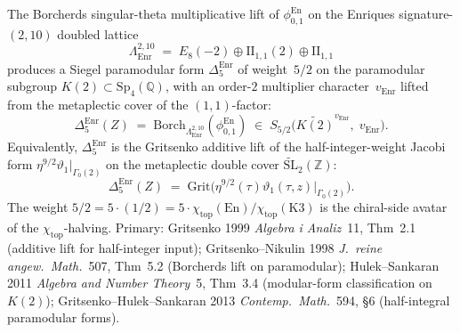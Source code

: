 \begin{theorem}
\label{thm:bkm-enriques-delta5}
The Borcherds singular-theta multiplicative lift of
$\phi^{\mathrm{En}}_{0,1}$ on the Enriques signature-$(2,10)$
doubled lattice
\[
 \Lambda^{2,10}_{\mathrm{Enr}}
 \;=\;
 E_8(-2) \oplus \mathrm{II}_{1,1}(2) \oplus \mathrm{II}_{1,1}
\]
produces a Siegel paramodular form $\Delta_5^{\mathrm{Enr}}$ of
weight~$5/2$ on the paramodular subgroup
$K(2)\subset\mathrm{Sp}_4(\mathbb{Q})$, with an order-$2$ multiplier
character~$v_{\mathrm{Enr}}$ lifted from the metaplectic cover of
the $(1,1)$-factor:
\[
 \Delta_5^{\mathrm{Enr}}(Z)
 \;=\;
 \mathrm{Borch}_{\Lambda^{2,10}_{\mathrm{Enr}}}(\phi^{\mathrm{En}}_{0,1})
 \;\in\;
 S_{5/2}\bigl(\widetilde{K(2)}^{v_{\mathrm{Enr}}},\; v_{\mathrm{Enr}}\bigr).
\]
Equivalently,
$\Delta_5^{\mathrm{Enr}}$ is the Gritsenko additive lift of the
half-integer-weight Jacobi form
$\eta^{9/2}\vartheta_1\bigr|_{\Gamma_0(2)}$ on the
metaplectic double cover $\widetilde{\mathrm{SL}}_2(\mathbb{Z})$:
\[
 \Delta_5^{\mathrm{Enr}}(Z)
 \;=\;
 \mathrm{Grit}\bigl(\eta^{9/2}(\tau)\vartheta_1(\tau,z)\bigr|_{\Gamma_0(2)}\bigr).
\]
The weight $5/2 = 5\cdot (1/2) = 5\cdot
\chi_{\mathrm{top}}(\mathrm{En})/\chi_{\mathrm{top}}(\mathrm{K3})$
is the chiral-side avatar of the
$\chi_{\mathrm{top}}$-halving. Primary:
Gritsenko 1999 \emph{Algebra i Analiz}~11, Thm~2.1
(additive lift for half-integer input);
Gritsenko--Nikulin 1998 \emph{J.~reine angew.~Math.}~507, Thm~5.2
(Borcherds lift on paramodular);
Hulek--Sankaran 2011 \emph{Algebra and Number Theory}~5, Thm~3.4
(modular-form classification on $K(2)$);
Gritsenko--Hulek--Sankaran 2013 \emph{Contemp.~Math.}~594, \S6
(half-integral paramodular forms).
\end{theorem}

